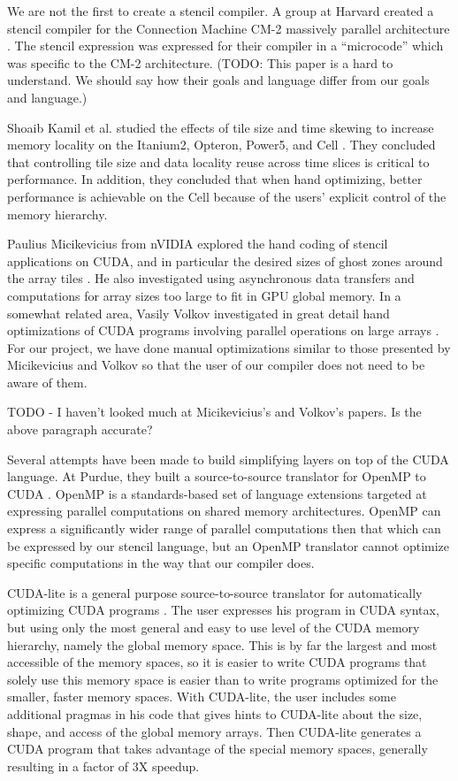 \documentclass{styles/sig-alternate}
\begin{document}
We are not the first to create a stencil compiler.  A group at Harvard
created a stencil compiler for the Connection Machine CM-2 massively
parallel architecture \cite{cm2}.  The stencil expression was
expressed for their compiler in a ``microcode'' which was specific to
the CM-2 architecture.  (TODO: This paper is a hard to understand.  We
should say how their goals and language differ from our goals and
language.)

Shoaib Kamil et al. studied the effects of tile size and time skewing
to increase memory locality on the Itanium2, Opteron, Power5, and Cell
\cite{kamil}.  They concluded that controlling tile size and data
locality reuse across time slices is critical to performance.  In
addition, they concluded that when hand optimizing, better performance
is achievable on the Cell because of the users’ explicit control of
the memory hierarchy.

Paulius Micikevicius from nVIDIA explored the hand coding of stencil
applications on CUDA, and in particular the desired sizes of ghost
zones around the array tiles \cite{Micikevicius}.  He also
investigated using asynchronous data transfers and computations for
array sizes too large to fit in GPU global memory.  In a somewhat
related area, Vasily Volkov investigated in great detail hand
optimizations of CUDA programs involving parallel operations on large
arrays \cite{volkov}.  For our project, we have done manual
optimizations similar to those presented by Micikevicius and Volkov so
that the user of our compiler does not need to be aware of them.

TODO - I haven't looked much at Micikevicius's and Volkov's papers.
Is the above paragraph accurate?

Several attempts have been made to build simplifying layers on top of
the CUDA language.  At Purdue, they built a source-to-source
translator for OpenMP to CUDA \cite{openmp}.  OpenMP is a
standards-based set of language extensions targeted at expressing
parallel computations on shared memory architectures.  OpenMP can
express a significantly wider range of parallel computations then that
which can be expressed by our stencil language, but an OpenMP
translator cannot optimize specific computations in the way that our
compiler does.

CUDA-lite is a general purpose source-to-source translator for
automatically optimizing CUDA programs \cite{cudalite}. The user
expresses his program in CUDA syntax, but using only the most general
and easy to use level of the CUDA memory hierarchy, namely the global
memory space.  This is by far the largest and most accessible of the
memory spaces, so it is easier to write CUDA programs that solely use
this memory space is easier than to write programs optimized for the
smaller, faster memory spaces.  With CUDA-lite, the user includes some
additional pragmas in his code that gives hints to CUDA-lite about the
size, shape, and access of the global memory arrays.  Then CUDA-lite
generates a CUDA program that takes advantage of the special memory
spaces, generally resulting in a factor of 3X speedup.
\end{document}
